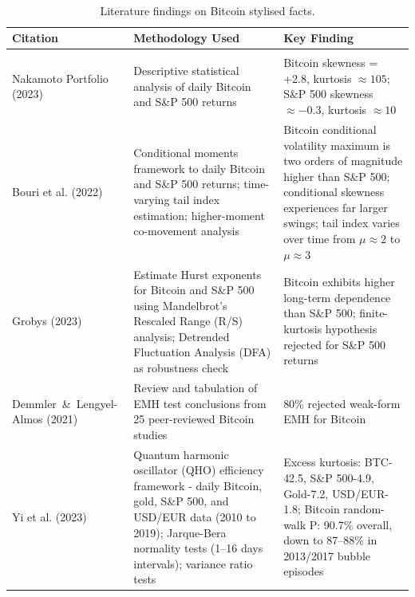 \
{  
\setlength{\LTright}{\fill}
\setlength{\LTpre}{2pt}
\setlength{\LTpost}{-5pt}
  
\renewcommand{\arraystretch}{0.75}
\begin{longtable}{| 
    >{\raggedright\arraybackslash\leftskip=-4.5pt}p{} | 
    >{\raggedright\arraybackslash\leftskip=-4.5pt}p{0.37\textwidth} | 
    >{\raggedright\arraybackslash\leftskip=-4.5pt}p{0.35\textwidth} |}
\caption{Literature findings on Bitcoin stylised facts.\label{tab:lit_bitcoin_facts}}\\
\hline
\textbf{Citation} & 
\textbf{Methodology Used} & 
\textbf{Key Finding} \\ 
\hline
\endfirsthead
    
\hline
\multicolumn{3}{r}{} \\
\endfoot
    
\hline
\endlastfoot

Nakamoto Portfolio (2023) \cite{BitcoinHistoricalReturns} & 
Descriptive statistical analysis of daily Bitcoin and S\&P 500 returns & 
Bitcoin skewness = +2.8, kurtosis $\approx 105$; S\&P 500 skewness $\approx -0.3$, kurtosis $\approx 10$ \\ 
\hline
Bouri et al. (2022) \cite{bouriBitcoinSP500Comovements2022} & 
Conditional moments framework to daily Bitcoin and S\&P 500 returns; time-varying tail index estimation; higher-moment co-movement analysis & 
Bitcoin conditional volatility maximum is two orders of magnitude higher than S\&P 500; conditional skewness experiences far larger swings; tail index varies over time from $\mu \approx 2$ to $\mu \approx 3$ \\ 
\hline
Grobys (2023) \cite{grobysFractalComparativeView2023} & 
Estimate Hurst exponents for Bitcoin and S\&P 500 using Mandelbrot's Rescaled Range (R/S) analysis; Detrended Fluctuation Analysis (DFA) as robustness check & 
Bitcoin exhibits higher long-term dependence than S\&P 500; finite-kurtosis hypothesis rejected for S\&P 500 returns \\ 
\hline
\mbox{Demmler \& Lengyel}-Almos (2021) \cite{lengyel-almosBitcoinMarketEfficient2021} & 
Review and tabulation of EMH test conclusions from 25 peer-reviewed Bitcoin studies & 
80\% rejected weak-form EMH for Bitcoin \\ 
\hline
Yi et al. (2023) \cite{yiMarketEfficiencyCryptocurrency2023} & 
Quantum harmonic oscillator (QHO) efficiency framework - daily Bitcoin, gold, S\&P 500, and USD/EUR data (2010 to 2019); Jarque-Bera normality tests (1--16 days intervals); variance ratio tests & 
Excess kurtosis: BTC-42.5, S\&P 500-4.9, Gold-7.2, USD/EUR-1.8; Bitcoin random-walk P: 90.7\% overall, down to 87--88\% in 2013/2017 bubble episodes \\ 
\hline
\end{longtable}
}
\renewcommand{\arraystretch}{1.0}
